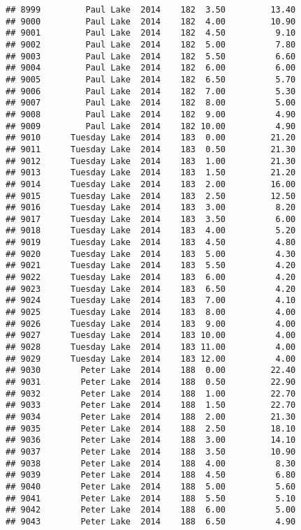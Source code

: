 \documentclass[
]{article}
\begin{document}
\begin{verbatim}
## 8999         Paul Lake  2014    182  3.50         13.40
## 9000         Paul Lake  2014    182  4.00         10.90
## 9001         Paul Lake  2014    182  4.50          9.10
## 9002         Paul Lake  2014    182  5.00          7.80
## 9003         Paul Lake  2014    182  5.50          6.60
## 9004         Paul Lake  2014    182  6.00          6.00
## 9005         Paul Lake  2014    182  6.50          5.70
## 9006         Paul Lake  2014    182  7.00          5.30
## 9007         Paul Lake  2014    182  8.00          5.00
## 9008         Paul Lake  2014    182  9.00          4.90
## 9009         Paul Lake  2014    182 10.00          4.90
## 9010      Tuesday Lake  2014    183  0.00         21.20
## 9011      Tuesday Lake  2014    183  0.50         21.30
## 9012      Tuesday Lake  2014    183  1.00         21.30
## 9013      Tuesday Lake  2014    183  1.50         21.20
## 9014      Tuesday Lake  2014    183  2.00         16.00
## 9015      Tuesday Lake  2014    183  2.50         12.50
## 9016      Tuesday Lake  2014    183  3.00          8.20
## 9017      Tuesday Lake  2014    183  3.50          6.00
## 9018      Tuesday Lake  2014    183  4.00          5.20
## 9019      Tuesday Lake  2014    183  4.50          4.80
## 9020      Tuesday Lake  2014    183  5.00          4.30
## 9021      Tuesday Lake  2014    183  5.50          4.20
## 9022      Tuesday Lake  2014    183  6.00          4.20
## 9023      Tuesday Lake  2014    183  6.50          4.20
## 9024      Tuesday Lake  2014    183  7.00          4.10
## 9025      Tuesday Lake  2014    183  8.00          4.00
## 9026      Tuesday Lake  2014    183  9.00          4.00
## 9027      Tuesday Lake  2014    183 10.00          4.00
## 9028      Tuesday Lake  2014    183 11.00          4.00
## 9029      Tuesday Lake  2014    183 12.00          4.00
## 9030        Peter Lake  2014    188  0.00         22.40
## 9031        Peter Lake  2014    188  0.50         22.90
## 9032        Peter Lake  2014    188  1.00         22.70
## 9033        Peter Lake  2014    188  1.50         22.70
## 9034        Peter Lake  2014    188  2.00         21.30
## 9035        Peter Lake  2014    188  2.50         18.10
## 9036        Peter Lake  2014    188  3.00         14.10
## 9037        Peter Lake  2014    188  3.50         10.90
## 9038        Peter Lake  2014    188  4.00          8.30
## 9039        Peter Lake  2014    188  4.50          6.80
## 9040        Peter Lake  2014    188  5.00          5.60
## 9041        Peter Lake  2014    188  5.50          5.10
## 9042        Peter Lake  2014    188  6.00          5.00
## 9043        Peter Lake  2014    188  6.50          4.90

\end{verbatim}
\end{document}

